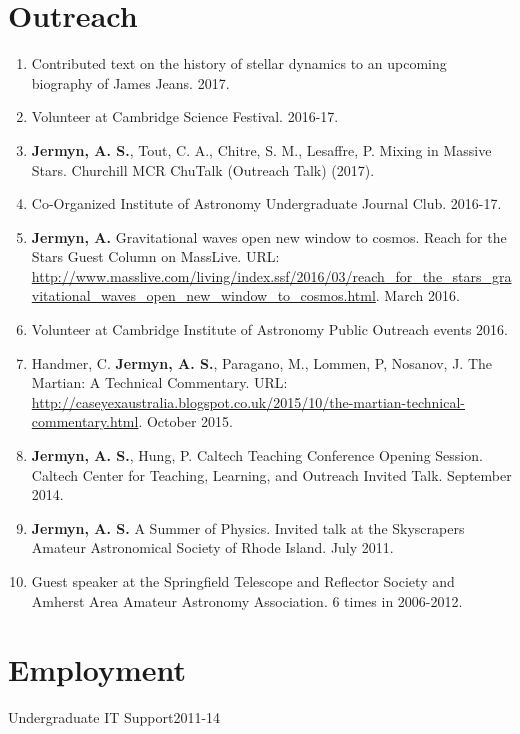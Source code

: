 \documentclass[line, margin]{res3address}
\begin{document}
\begin{resume}
\section{Outreach}
\begin{enumerate}[leftmargin=10pt]
\item Contributed text on the history of stellar dynamics to an upcoming biography of James Jeans. 2017.
\item Volunteer at Cambridge Science Festival. 2016-17.
\item \textbf{Jermyn, A. S.}, Tout, C. A., Chitre, S. M., Lesaffre, P. Mixing in Massive Stars. Churchill MCR ChuTalk (Outreach Talk) (2017).
\item Co-Organized Institute of Astronomy Undergraduate Journal Club. 2016-17.
\item \textbf{Jermyn, A. } Gravitational waves open new window to cosmos. Reach for the Stars Guest Column on MassLive. URL: \url{http://www.masslive.com/living/index.ssf/2016/03/reach_for_the_stars_gravitational_waves_open_new_window_to_cosmos.html}. March 2016.
\item Volunteer at Cambridge Institute of Astronomy Public Outreach events 2016.
\item Handmer, C. \textbf{Jermyn, A. S.}, Paragano, M., Lommen, P, Nosanov, J. The Martian: A Technical Commentary. URL: \url{http://caseyexaustralia.blogspot.co.uk/2015/10/the-martian-technical-commentary.html}. October 2015.
\item \textbf{Jermyn, A. S.}, Hung, P. Caltech Teaching Conference Opening Session. Caltech Center for Teaching, Learning, and Outreach Invited Talk. September 2014.
\item \textbf{Jermyn, A. S.} A Summer of Physics. Invited talk at the Skyscrapers Amateur Astronomical Society of Rhode Island. July 2011.
\item Guest speaker at the Springfield Telescope and Reflector Society and Amherst Area Amateur Astronomy Association. 6 times in 2006-2012.
\end{enumerate}

\section{Employment}
Undergraduate IT Support\hfill 2011-14


\end{resume}
\end{document}
